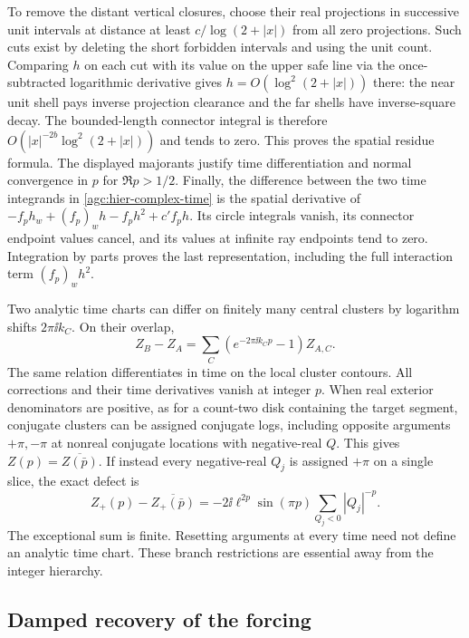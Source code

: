 To remove the distant vertical closures, choose their real projections
in successive unit intervals at distance at least
$c/\log(2+|x|)$ from all zero projections. Such cuts exist by
deleting the short forbidden intervals and using the unit count.
Comparing $h$ on each cut with its value on the upper safe line
via the once-subtracted logarithmic derivative gives
$h=O(\log^2(2+|x|))$ there: the near unit shell pays inverse
projection clearance and the far shells have inverse-square decay.
The bounded-length connector integral is therefore
$O(|x|^{-2b}\log^2(2+|x|))$ and tends to zero. This proves the
spatial residue formula. The displayed majorants justify time
differentiation and normal convergence in $p$ for $\Re p>1/2$.
Finally, the difference between the two time integrands in
\eqref{agc:hier-complex-time} is the spatial derivative of
$-f_ph_w+(f_p)_wh-f_ph^2+c'f_ph$. Its circle integrals vanish,
its connector endpoint values cancel, and its values at infinite
ray endpoints tend to zero. Integration by parts proves the last
representation, including the full interaction term $(f_p)_wh^2$.

Two analytic time charts can differ on finitely many central clusters
by logarithm shifts $2\pi\ii k_C$. On their overlap,
\begin{equation}
 Z_B-Z_A=\sum_C(e^{-2\pi\ii k_Cp}-1)Z_{A,C}.
 \label{agc:hier-branch-transition}
\end{equation}
The same relation differentiates in time on the local cluster
contours. All corrections and their time derivatives vanish at
integer $p$. When real exterior denominators are positive, as for
a count-two disk containing the target segment, conjugate clusters
can be assigned conjugate logs, including opposite arguments
$+\pi,-\pi$ at nonreal conjugate locations with negative-real $Q$. This gives
$Z(p)=\overline{Z(\bar p)}$. If instead every negative-real
$Q_j$ is assigned $+\pi$ on a single slice, the exact defect is
\[
 Z_+(p)-\overline{Z_+(\bar p)}
   =-2\ii\ell^{2p}\sin(\pi p)\sum_{Q_j<0}|Q_j|^{-p}.
\]
The exceptional sum is finite. Resetting arguments at every time
need not define an analytic time chart. These branch restrictions
are essential away from the integer hierarchy.

\subsection{Damped recovery of the forcing}

